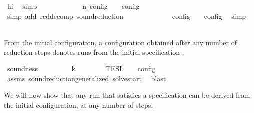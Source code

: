 \begin{isabellebody}
\ hi\ \isamarkupfalse%
\ simp\isanewline
\ \ \ \ \ \ \ \ \isamarkupfalse%
\ \isamarkupfalse%
\ {\isacartoucheopen}{\isasymlbrakk}\ {\isasymS}\isactrlsub n\ {\isasymrbrakk}\isactrlsub c\isactrlsub o\isactrlsub n\isactrlsub f\isactrlsub i\isactrlsub g\ {\isasymsupseteq}\ {\isasymlbrakk}\ {\isasymS}\ {\isasymrbrakk}\isactrlsub c\isactrlsub o\isactrlsub n\isactrlsub f\isactrlsub i\isactrlsub g{\isacartoucheclose}\ \isamarkupfalse%
\ {\isacharparenleft}simp\ add{\isacharcolon}\ red{\isacharunderscore}decomp\ sound{\isacharunderscore}reduction{\isacharprime}{\isacharparenright}\isanewline
\ \ \ \ \ \ \ \ \isamarkupfalse%
\ \isamarkupfalse%
\ {\isacartoucheopen}{\isasymlbrakk}\ {\isasymS}\ {\isasymrbrakk}\isactrlsub c\isactrlsub o\isactrlsub n\isactrlsub f\isactrlsub i\isactrlsub g\ {\isasymsupseteq}\ {\isasymlbrakk}\ {\isasymS}\ {\isasymrbrakk}\isactrlsub c\isactrlsub o\isactrlsub n\isactrlsub f\isactrlsub i\isactrlsub g{\isacartoucheclose}\ \isamarkupfalse%
\ simp\isanewline
\ \ \ \ \ \ \isamarkupfalse%
\isanewline
\ \ \isamarkupfalse%
\isanewline
{}\isamarkupfalse%
%
\endisatagproof
{\isafoldproof}%
%
\isadelimproof
%
\endisadelimproof
%
\begin{isamarkuptext}%
From the initial configuration, a configuration \isa{{\isasymS}} obtained after any 
  number  of reduction steps denotes runs from the 
  initial specification \isa{{\isasymPsi}}.%
\end{isamarkuptext}\isamarkuptrue%
\isamarkupfalse%
\ soundness{\isacharcolon}\isanewline
\ \ \ {\isacartoucheopen}{\isacharparenleft}{\isacharbrackleft}{\isacharbrackright}{\isacharcomma}\ {}\ {\isasymturnstile}\ {\isasymPsi}\ {\isasymtriangleright}\ {\isacharbrackleft}{\isacharbrackright}{\isacharparenright}\ {\isasymhookrightarrow}\isactrlbsup k\isactrlesup \ {\isasymS}{\isacartoucheclose}\isanewline
\ \ \ \ \ {\isacartoucheopen}{\isasymlbrakk}{\isasymlbrakk}\ {\isasymPsi}\ {\isasymrbrakk}{\isasymrbrakk}\isactrlsub T\isactrlsub E\isactrlsub S\isactrlsub L\ {\isasymsupseteq}\ {\isasymlbrakk}\ {\isasymS}\ {\isasymrbrakk}\isactrlsub c\isactrlsub o\isactrlsub n\isactrlsub f\isactrlsub i\isactrlsub g{\isacartoucheclose}\isanewline
%
\isadelimproof
\ \ %
\endisadelimproof
%
\isatagproof
{}\isamarkupfalse%
\ assms\ sound{\isacharunderscore}reduction{\isacharunderscore}generalized\ solve{\isacharunderscore}start\ \isamarkupfalse%
\ blast%
\endisatagproof
{\isafoldproof}%
%
\isadelimproof
%
\endisadelimproof
%
\isadelimdocument
%
\endisadelimdocument
%
\isatagdocument
%
\isamarkuptrue%
%
\endisatagdocument
{\isafolddocument}%
%
\isadelimdocument
%
\endisadelimdocument
%
\begin{isamarkuptext}%
We will now show that any run that satisfies a specification can be derived
  from the initial configuration, at any number of steps.


\end{isamarkuptext}
\end{isabellebody}
